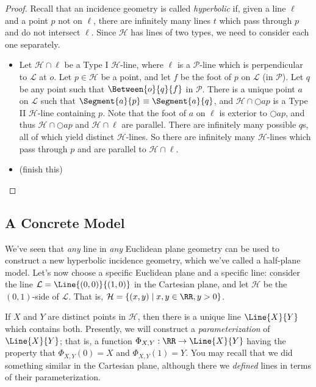 \begin{proof}
Recall that an incidence geometry is called \emph{hyperbolic} if, given a line \(\ell\) and a point \(p\) not on \(\ell\), there are infinitely many lines \(t\) which pass through \(p\) and do not intersect \(\ell\). Since \(\mathcal{H}\) has lines of two types, we need to consider each one separately.
\begin{itemize}
\item Let \(\mathcal{H} \cap \ell\) be a Type I \(\mathcal{H}\)-line, where \(\ell\) is a \(\mathcal{P}\)-line which is perpendicular to \(\mathcal{L}\) at \(o\). Let \(p \in \mathcal{H}\) be a point, and let \(f\) be the foot of \(p\) on \(\mathcal{L}\) (in \(\mathcal{P}\)). Let \(q\) be any point such that \(\Between{o}{q}{f}\) in \(\mathcal{P}\). There is a unique point \(a\) on \(\mathcal{L}\) such that \(\Segment{a}{p} \equiv \Segment{a}{q}\), and \(\mathcal{H} \cap \Circle{a}{p}\) is a Type II \(\mathcal{H}\)-line containing \(p\). Note that the foot of \(a\) on \(\ell\) is exterior to \(\Circle{a}{p}\), and thus \(\mathcal{H} \cap \Circle{a}{p}\) and \(\mathcal{H} \cap \ell\) are parallel. There are infinitely many possible \(q\)s, all of which yield distinct \(\mathcal{H}\)-lines. So there are infinitely many \(\mathcal{H}\)-lines which pass through \(p\) and are parallel to \(\mathcal{H} \cap \ell\).
\item (finish this) \qedhere
\end{itemize}
\end{proof}

\subsection*{A Concrete Model}

We've seen that \emph{any} line in \emph{any} Euclidean plane geometry can be used to construct a new hyperbolic incidence geometry, which we've called a half-plane model. Let's now choose a specific Euclidean plane and a specific line: consider the line \(\mathcal{L} = \Line{(0,0)}{(1,0)}\) in the Cartesian plane, and let \(\mathcal{H}\) be the \((0,1)\)-side of \(\mathcal{L}\). That is, \(\mathcal{H} = \{ (x,y) \mid x,y \in \RR, y > 0 \}\).

If \(X\) and \(Y\) are distinct points in \(\mathcal{H}\), then there is a unique line \(\Line{X}{Y}\) which contains both. Presently, we will construct a \emph{parameterization} of \(\Line{X}{Y}\); that is, a function \(\Phi_{X,Y} : \RR \rightarrow \Line{X}{Y}\) having the property that \(\Phi_{X,Y}(0) = X\) and \(\Phi_{X,Y}(1) = Y\). You may recall that we did something similar in the Cartesian plane, although there we \emph{defined} lines in terms of their parameterization.

